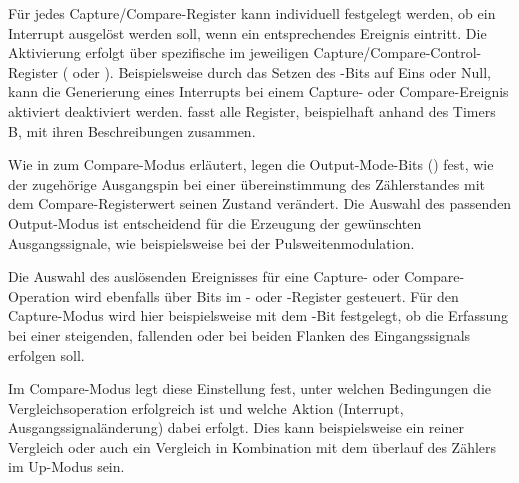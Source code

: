 F\"ur jedes Capture/Compare-Register kann individuell festgelegt werden, ob ein Interrupt ausgel\"ost werden soll, wenn ein entsprechendes Ereignis eintritt. Die Aktivierung erfolgt \"uber spezifische  im jeweiligen Capture/Compare-Control-Register ( oder ). Beispielsweise durch das Setzen des -Bits auf Eins oder Null, kann die Generierung eines Interrupts bei einem Capture- oder Compare-Ereignis aktiviert \bzw deaktiviert werden.  fasst alle Register, beispielhaft anhand des Timers B, mit ihren Beschreibungen zusammen.

Wie in  zum Compare-Modus erl\"autert, legen die Output-Mode-Bits () fest, wie der zugeh\"orige Ausgangspin bei einer \"ubereinstimmung des Z\"ahlerstandes mit dem Compare-Registerwert seinen Zustand ver\"andert. Die Auswahl des passenden Output-Modus ist entscheidend f\"ur die Erzeugung der gew\"unschten Ausgangssignale, wie beispielsweise bei der Pulsweitenmodulation.

Die Auswahl des ausl\"osenden Ereignisses f\"ur eine Capture- oder Compare-Operation wird ebenfalls \"uber Bits im - oder -Register gesteuert. F\"ur den Capture-Modus wird hier beispielsweise mit dem -Bit festgelegt, ob die Erfassung bei einer steigenden, fallenden oder bei beiden Flanken des Eingangssignals erfolgen soll. 

\newpage
Im Compare-Modus legt diese Einstellung fest, unter welchen Bedingungen die Vergleichsoperation erfolgreich ist und welche Aktion (Interrupt, Ausgangssignal\"anderung) dabei erfolgt. Dies kann beispielsweise ein reiner Vergleich oder auch ein Vergleich in Kombination mit dem \"uberlauf des Z\"ahlers im Up-Modus sein. 

